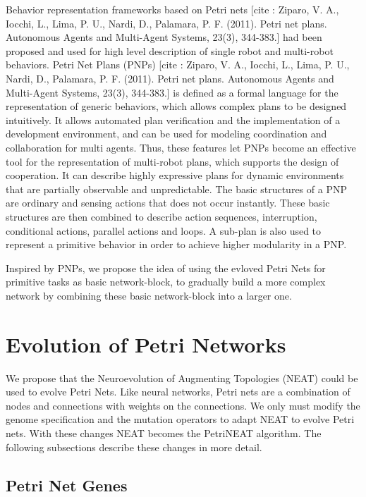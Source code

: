 \documentclass[12pt,a4paper,twocolumn]{article}
\begin{document}
Behavior representation frameworks based on Petri nets [cite : Ziparo, V. A., Iocchi, L., Lima, P. U., Nardi, D., Palamara, P. F. (2011). Petri net plans. Autonomous Agents and Multi-Agent Systems, 23(3), 344-383.] had been proposed and used for high level description of single robot and multi-robot behaviors. Petri Net Plans (PNPs) [cite : Ziparo, V. A., Iocchi, L., Lima, P. U., Nardi, D., Palamara, P. F. (2011). Petri net plans. Autonomous Agents and Multi-Agent Systems, 23(3), 344-383.] is defined as a formal language for the representation of generic behaviors, which allows complex plans to be designed intuitively. It allows automated plan verification and the implementation of a development environment, and can be used for modeling coordination and collaboration for multi agents. Thus, these features let PNPs become an effective tool for the representation of multi-robot plans, which supports the design of cooperation. It can describe highly expressive plans for dynamic environments that are partially observable and unpredictable. The basic structures of a PNP are ordinary and sensing actions that does not occur instantly. These basic structures are then combined to describe action sequences, interruption, conditional actions, parallel actions and loops. A sub-plan is also used to represent a primitive behavior in order to achieve higher modularity in a PNP. 

Inspired by PNPs, we propose the idea of using the evloved Petri Nets for primitive tasks as basic network-block, to gradually build a more complex network by combining these basic network-block into a larger one. 

\section{Evolution of Petri Networks}

We propose that the Neuroevolution of Augmenting Topologies (NEAT) could be used to evolve Petri Nets. Like neural networks, Petri nets are a combination of nodes and connections with weights on the connections. We only must modify the genome specification and the mutation operators to adapt NEAT to evolve Petri nets. With these changes NEAT becomes the PetriNEAT algorithm. The following subsections describe these changes in more detail.

\subsection{Petri Net Genes}
\end{document}
